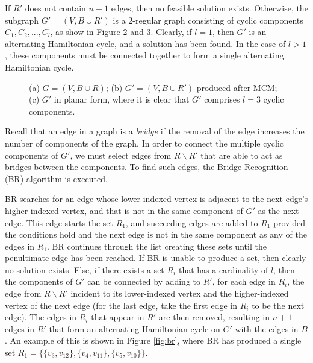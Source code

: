\documentclass{elsarticle}
\begin{document}
If $R'$ does not contain $n+1$ edges, then no feasible solution exists. Otherwise, the subgraph $G'=(V, B \cup R')$ is a 2-regular graph consisting of cyclic components $C_1,C_2,...,C_l$, as show in Figure \ref{fig:matching} and \ref{fig:mps}. Clearly, if $l = 1$, then $G'$ is an alternating Hamiltonian cycle, and a solution has been found. In the case of $l > 1$, these components must be connected together to form a single alternating Hamiltonian cycle.

\begin{figure}[H]	
	\centering
	\begin{subfigure}[h]{0.3\textwidth}
		
		\caption{}
		\label{fig:threshold}
	\end{subfigure} \hspace{5mm}
	\begin{subfigure}[h]{0.3\textwidth}
		
		\caption{}
		\label{fig:matching}
	\end{subfigure} \hspace{5mm}
	\begin{subfigure}[h]{0.25\textwidth}
		
		\caption{}
		\label{fig:mps}
	\end{subfigure}
	\caption{(a) $G = (V, B\cup R)$; (b) $G'=(V, B \cup R')$ produced after MCM; (c) $G'$ in planar form, where it is clear that $G'$ comprises $l = 3$ cyclic components.}
	\label{fig:mcm}
\end{figure}

Recall that an edge in a graph is a \emph{bridge} if the removal of the edge increases the number of components of the graph. In order to connect the multiple cyclic components of $G'$, we must select edges from $R \backslash R'$ that are able to act as bridges between the components. To find such edges, the Bridge Recognition (BR) algorithm is executed.

BR searches for an edge whose lower-indexed vertex is adjacent to the next edge's higher-indexed vertex, and that is not in the same component of $G'$ as the next edge. This edge starts the set $R_1$, and succeeding edges are added to $R_1$ provided the conditions hold and the next edge is not in the same component as any of the edges in $R_1$. BR continues through the list creating these sets until the penultimate edge has been reached. If BR is unable to produce a set, then clearly no solution exists. Else, if there exists a set $R_i$ that has a cardinality of $l$, then the components of $G'$ can be connected by adding to $R'$, for each edge in $R_i$, the edge from $R \backslash R'$ incident to its lower-indexed vertex and the higher-indexed vertex of the next edge (for the last edge, take the first edge in $R_i$ to be the next edge). The edges in $R_i$ that appear in $R'$ are then removed, resulting in $n+1$ edges in $R'$ that form an alternating Hamiltonian cycle on $G'$ with the edges in $B$. An example of this is shown in Figure \ref{fig:br}, where BR has produced a single set $R_1 = \{\{v_3, v_{12}\},\{v_4, v_{11}\}, \{v_5, v_{10}\}\}$.
\end{document}
